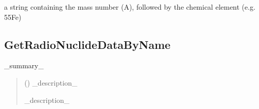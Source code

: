 \documentclass[letterpaper,10pt,english,openany,oneside]{sphinxmanual}
\begin{document}
\begin{fulllineitems}
\begin{fulllineitems}
\end{fulllineitems}


\begin{fulllineitems}
\label{\detokenize{api/radionuclides:dxraylib.xraylib_radionuclides.radioNuclideData.name}}
\pysigstartsignatures
{}
\pysigstopsignatures
\sphinxAtStartPar
a string containing the mass number (A), followed by the chemical
element (e.g. 55Fe)

\end{fulllineitems}


\end{fulllineitems}



\subsection{GetRadioNuclideDataByName}
\label{\detokenize{api/radionuclides:getradionuclidedatabyname}}

\begin{fulllineitems}
\label{\detokenize{api/radionuclides:dxraylib.GetRadioNuclideDataByName}}
\pysigstartsignatures
{}
\pysigstopsignatures
\sphinxAtStartPar
\_summary\_
\begin{quote}\begin{description}
\sphinxAtStartPar
{} () \textendash{} \_description\_

\sphinxAtStartPar
\_description\_

\sphinxAtStartPar
{\hyperref[\detokenize{api/radionuclides:dxraylib.xraylib_radionuclides.radioNuclideData}]{}}

\end{description}\end{quote}

\end{fulllineitems}
\end{document}
